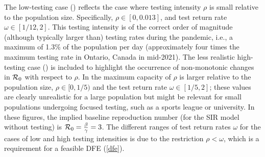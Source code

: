 The low-testing case () reflects the case where testing intensity $\rho$ is small relative to the population size. Specifically, $\rho \in [0,0.013]$, and test return rate $\omega\in [1/12,2]$. This testing intensity is of the correct order of magnitude (although typically larger than) testing rates during the \covid pandemic, i.e., a maximum of 1.3\% of the population per day (approximately four times the maximum testing rate in Ontario, Canada in mid-2021). The less realistic high-testing case () is included to highlight the occurrence of non-monotonic changes in $\mathcal{R}_0$ with respect to $\rho$.
In  the maximum capacity of $\rho$ is larger relative to the population size, $\rho \in [0,1/5)$ and the test return rate $\omega\in [1/5,2]$; these values are clearly unrealistic for a large population but might be relevant for small populations undergoing focused testing, such as a sports league or university. In these figures, the implied baseline reproduction number (for the SIR model without testing) is $\mathcal{R}_0=\frac{\beta}{\gamma}=3$.  The different ranges of test return rates $\omega$ for the cases of low and high testing intensities is due to the restriction $\rho<\omega$, which is a requirement for a feasible DFE (\ref{dfe}).
  